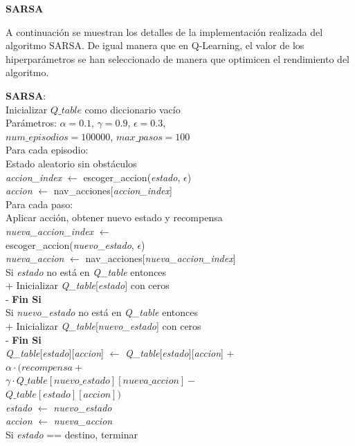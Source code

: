 \documentclass[conference,a4paper]{IEEEtran}
\begin{document}
  \textbf{\newline SARSA}

A continuación se muestran los detalles de la implementación realizada del algoritmo SARSA. De igual manera que en Q-Learning, el valor de los hiperparámetros
se han seleccionado de manera que optimicen el rendimiento del algoritmo.

  \begin{minipage}{\linewidth}
    \begin{pseudo}[compact]
      \textbf{SARSA}: \\
      Inicializar $Q\_table$ como diccionario vacío \\
      Parámetros: $\alpha = 0.1$, $\gamma = 0.9$, $\epsilon = 0.3$, \\ $num\_episodios = 100000$, $max\_pasos = 100$ \\
      Para cada episodio: \\
      \> Estado aleatorio sin obstáculos \\
      \> \textit{accion\_index} $\leftarrow$ escoger\_accion(\textit{estado}, $\epsilon$) \\
      \> \textit{accion} $\leftarrow$ nav\_acciones[\textit{accion\_index}] \\
      \> Para cada paso: \\
      \> \> Aplicar acción, obtener nuevo estado y recompensa \\
      \> \> \textit{nueva\_accion\_index} $\leftarrow$ \\
      \> \> \> escoger\_accion(\textit{nuevo\_estado}, $\epsilon$) \\
      \> \> \textit{nueva\_accion} $\leftarrow$ nav\_acciones[\textit{nueva\_accion\_index}] \\
      Si \textit{estado} no está en \textit{Q\_table} entonces \\+
      Inicializar \textit{Q\_table}[\textit{estado}] con ceros \\-
  \textbf{Fin Si} \\
  Si \textit{nuevo\_estado} \textnormal{no está en} \textit{Q\_table} entonces \\+
    Inicializar \textit{Q\_table}[\textit{nuevo\_estado}] con ceros \\-
  \textbf{Fin Si} \\
  \textit{Q\_table}[\textit{estado}][\textit{accion}] $\leftarrow$ \textit{Q\_table}[\textit{estado}][\textit{accion}] + \\
  \> $\alpha \cdot (\textit{recompensa} + $ \\
  \> $\gamma \cdot \textit{Q\_table}[\textit{nuevo\_estado}][\textit{nueva\_accion}] -$ \\
  \> $\textit{Q\_table}[\textit{estado}][\textit{accion}])$ \\
  \> \textit{estado} $\leftarrow$ \textit{nuevo\_estado} \\
  \> \textit{accion} $\leftarrow$ \textit{nueva\_accion} \\
  \> Si \textit{estado} == destino, terminar \\
  \end{pseudo}
  \end{minipage}\newline
\end{document}
